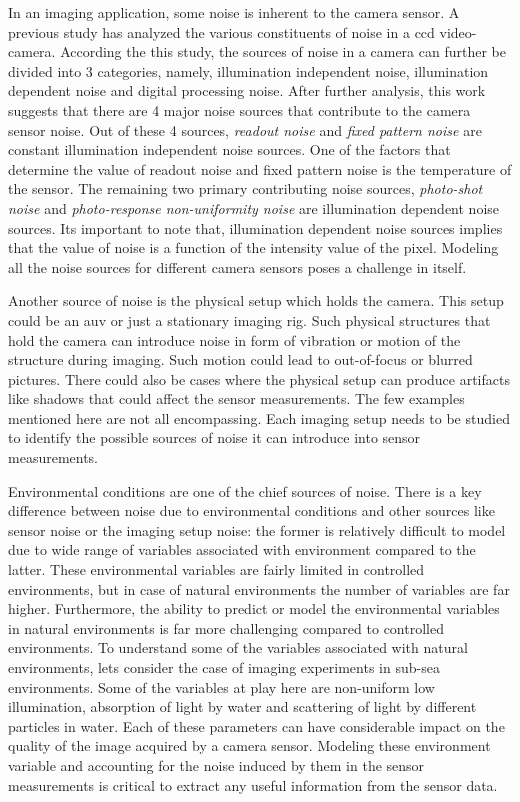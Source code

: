 In an imaging application, some noise is inherent to the camera sensor. A previous study \cite{irie} has analyzed the various constituents of noise 
in a \gls{ccd} video-camera. According the this study, the sources of noise in a camera can further be divided into 3 categories, namely, illumination independent noise, illumination dependent noise and digital processing noise. After further analysis, this work suggests that there are 4 major noise sources that contribute to the camera sensor noise. Out of these 4 sources, \emph{readout noise} and \emph{fixed pattern noise} are constant illumination independent noise sources. One of the factors that determine the value of readout noise and fixed pattern noise is the temperature of the sensor. The remaining two primary contributing noise sources, \emph{photo-shot noise} and \emph{photo-response non-uniformity noise} are illumination dependent noise sources. Its important to note that, illumination dependent noise sources implies that the value of noise is a function of the intensity value of the pixel. Modeling all the noise sources for different camera sensors poses a challenge in itself.

Another source of noise is the physical setup which holds the camera. This setup could be an \gls{auv} or just a stationary imaging rig. Such physical structures that hold the camera can introduce noise in form of vibration or motion of the structure during imaging. Such motion could lead to out-of-focus or blurred pictures. There could also be cases where the physical setup can produce artifacts like shadows that could affect the sensor measurements. The few examples mentioned here are not all encompassing. Each imaging setup needs to be studied to identify the possible sources of noise it can introduce into sensor measurements.

Environmental conditions are one of the chief sources of noise. 
There is a key difference between noise due to environmental conditions 
and other sources like sensor noise or the imaging setup noise: the former is relatively difficult to model due to wide range of variables associated with environment compared to the latter. 
These environmental variables are fairly limited in controlled environments, but in case of natural environments
the number of variables are far higher. Furthermore, the ability to predict or model the environmental variables in natural
environments is far more challenging compared to controlled environments. To understand some of the variables associated with natural environments, lets consider the case of imaging experiments in sub-sea environments. 
Some of the variables at play here are non-uniform low illumination, absorption of light by water
and scattering of light by different particles in water. Each of these parameters can have considerable impact on the quality of the image acquired by
a camera sensor. Modeling these environment variable and accounting for the noise induced by them in the sensor measurements is critical to extract any useful
information from the sensor data.

